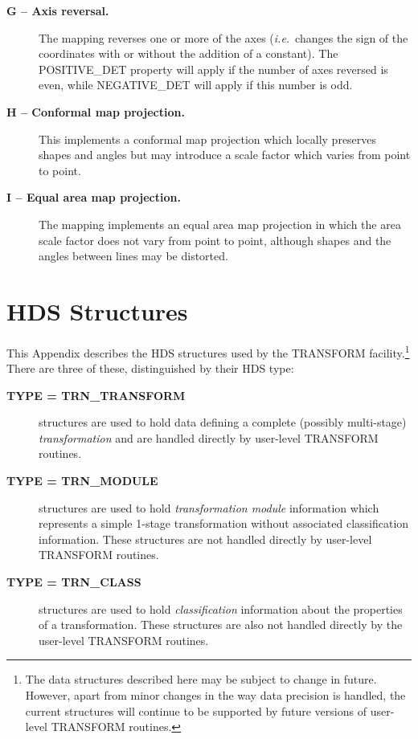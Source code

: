 \documentclass[twoside,11pt]{article}
\newcommand{\xlabel}[1]{}
\newcommand{\name}[1]{\mbox{\small{#1}}}
\begin{document}
\begin{description}
\item[\textbf{G -- Axis reversal.}] The mapping reverses one or more of the
axes (\emph{i.e.}\ changes the sign of the coordinates with or without the
addition of a constant). 
The \name{POSITIVE\_DET} property will apply if the number of axes reversed
is even, while \name{NEGATIVE\_DET} will apply if this number is odd. 

\item[\textbf{H -- Conformal map projection.}] This implements a
conformal map projection which locally preserves shapes and angles but may
introduce a scale factor which varies from point to point.

\item[\textbf{I -- Equal area map projection.}] The mapping implements an
equal area map projection in which the area scale factor does not vary from
point to point, although shapes and the angles between lines may be
distorted. 

\end{description}

\newpage
\section{\xlabel{hds_structures}HDS Structures}

\label{appendix_structures}

This Appendix describes the \name{HDS} structures used by the
\name{TRANSFORM} facility.\footnote{
The data structures described here may be subject to change in future.
However, apart from minor changes in the way data precision is handled, the
current structures will continue to be supported by future versions of
user-level \name{TRANSFORM} routines. 
}
There are three of these, distinguished by their HDS type: 

\begin{description}

\item[\textbf{TYPE = \name{TRN\_TRANSFORM}}] structures are used to hold data
defining a complete (possibly multi-stage) \emph{transformation} and are
handled directly by user-level \name{TRANSFORM} routines. 

\item[\textbf{TYPE = \name{TRN\_MODULE}}] structures are used to hold 
\emph{transformation module} information which represents a simple 1-stage
transformation without associated classification information. 
These structures are not handled directly by user-level \name{TRANSFORM} 
routines. 

\item[\textbf{TYPE = \name{TRN\_CLASS}}] structures are used to hold
{\em classification} information about the properties of a transformation. 
These structures are also not handled directly by the user-level
\name{TRANSFORM} routines. 

\end{description}
\end{document}
